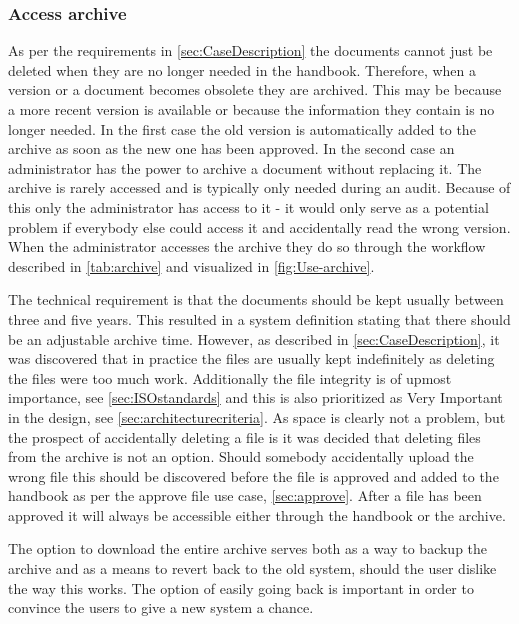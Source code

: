 \subsubsection{Access archive}
As per the requirements in \cref{sec:CaseDescription} the documents cannot just be deleted when they are no longer needed in the handbook.
Therefore, when a version or a document becomes obsolete they are archived.
This may be because a more recent version is available or because the information they contain is no longer needed.
In the first case the old version is automatically added to the archive as soon as the new one has been approved.
In the second case an administrator has the power to archive a document without replacing it.
The archive is rarely accessed and is typically only needed during an audit.
Because of this only the administrator has access to it - it would only serve as a potential problem if everybody else could access it and accidentally read the wrong version.
When the administrator accesses the archive they do so through the workflow described in \cref{tab:archive} and visualized in \cref{fig:Use-archive}.




The technical requirement is that the documents should be kept usually between three and five years.
This resulted in a system definition stating that there should be an adjustable archive time.
However, as described in \cref{sec:CaseDescription}, it was discovered that in practice the files are usually kept indefinitely as deleting the files were too much work.
Additionally the file integrity is of upmost importance, see \cref{sec:ISOstandards} and this is also prioritized as Very Important in the design, see \cref{sec:architecturecriteria}.
As space is clearly not a problem, but the prospect of accidentally deleting a file is it was decided that deleting files from the archive is not an option.
Should somebody accidentally upload the wrong file this should be discovered before the file is approved and added to the handbook as per the approve file use case, \cref{sec:approve}.
After a file has been approved it will always be accessible either through the handbook or the archive.

The option to download the entire archive serves both as a way to backup the archive and as a means to revert back to the old system, should the user dislike the way this works.
The option of easily going back is important in order to convince the users to give a new system a chance.

